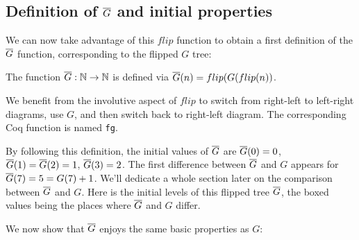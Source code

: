 \documentclass[a4paper,11pt]{article}
\begin{document}
\subsection*{Definition of $\overline{G}$ and initial properties}

We can now take advantage of this $flip$ function to obtain
a first definition of the $\overline{G}$ function, corresponding to the
flipped $G$ tree:

\begin{definition}
The function $\overline{G} : \mathbb{N}\to\mathbb{N}$ is defined via
$\overline{G}(n) = flip(G(flip(n))$.
\end{definition}

We benefit from the involutive aspect of $flip$ to switch
from right-left to left-right diagrams, use $G$, and then
switch back to right-left diagram. The corresponding Coq function
is named {\tt fg}.

By following this definition, the initial values of $\overline{G}$ are
$\overline{G}(0)=0$, $\overline{G}(1)=\overline{G}(2)=1$, $\overline{G}(3)=2$. The first difference
between $\overline{G}$ and $G$ appears for $\overline{G}(7)=5=G(7)+1$. We'll dedicate a
whole section later on the comparison between $\overline{G}$ and $G$.
Here is the initial levels of this flipped tree $\overline{G}$,
the boxed values being the places where $\overline{G}$ and $G$ differ.

\bigskip


We now show that $\overline{G}$ enjoys the same basic properties as $G$:
\end{document}
